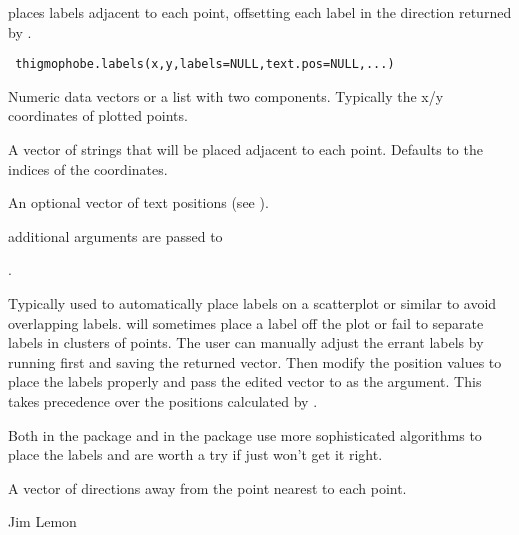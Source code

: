 \begin{Description}\relax
{} places labels adjacent to each point, 
offsetting each label in the direction returned by 
.
\end{Description}
\begin{Usage}
\begin{verbatim}
 thigmophobe.labels(x,y,labels=NULL,text.pos=NULL,...)
\end{verbatim}
\end{Usage}
\begin{Arguments}
\begin{ldescription}
\item[\code{x,y}] Numeric data vectors or a list with two components. 
Typically the x/y coordinates of plotted points.
\item[\code{labels}] A vector of strings that will be placed adjacent to
each point. Defaults to the indices of the coordinates.
\item[\code{text.pos}] An optional vector of text positions (see 
).
\item[\code{...}] additional arguments are passed to 
\end{ldescription}
.
\end{Arguments}
\begin{Details}\relax
Typically used to automatically place labels on a scatterplot or 
similar to avoid overlapping labels. 
will sometimes place a label off the plot or fail to separate
labels in clusters of points. The user can manually adjust the
errant labels by running  first and saving
the returned vector. Then modify the position values to place
the labels properly and pass the edited vector to
 as the  argument. This
takes precedence over the positions calculated by .

Both  in the  package and 
in the  package use more sophisticated algorithms to
place the labels and are worth a try if  just won't get it
right.
\end{Details}
\begin{Value}
A vector of directions away from the point nearest to each point.
\end{Value}
\begin{Author}\relax
Jim Lemon
\end{Author}
